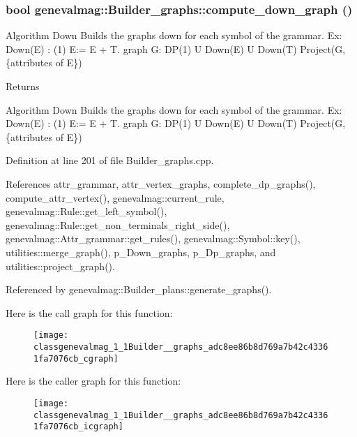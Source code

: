 \hypertarget{classgenevalmag_1_1Builder__graphs_adc8ee86b8d769a7b42c43361fa7076cb}{
\subsubsection[{compute\_\-down\_\-graph}]{\setlength{\rightskip}{0pt plus 5cm}bool genevalmag::Builder\_\-graphs::compute\_\-down\_\-graph ()}}
\label{classgenevalmag_1_1Builder__graphs_adc8ee86b8d769a7b42c43361fa7076cb}
Algorithm Down Builds the graphs down for each symbol of the grammar. Ex: Down(E) : (1) E:= E + T. graph G: DP(1) U Down(E) U Down(T) Project(G,\{attributes of E\}) \begin{DoxyReturn}{Returns}

\end{DoxyReturn}
Algorithm Down Builds the graphs down for each symbol of the grammar. Ex: Down(E) : (1) E:= E + T. graph G: DP(1) U Down(E) U Down(T) Project(G,\{attributes of E\}) 

Definition at line 201 of file Builder\_\-graphs.cpp.



References attr\_\-grammar, attr\_\-vertex\_\-graphs, complete\_\-dp\_\-graphs(), compute\_\-attr\_\-vertex(), genevalmag::current\_\-rule, genevalmag::Rule::get\_\-left\_\-symbol(), genevalmag::Rule::get\_\-non\_\-terminals\_\-right\_\-side(), genevalmag::Attr\_\-grammar::get\_\-rules(), genevalmag::Symbol::key(), utilities::merge\_\-graph(), p\_\-Down\_\-graphs, p\_\-Dp\_\-graphs, and utilities::project\_\-graph().



Referenced by genevalmag::Builder\_\-plans::generate\_\-graphs().



Here is the call graph for this function:\nopagebreak
\begin{figure}[H]
\begin{center}
\leavevmode
\texttt{[image: classgenevalmag\_1\_1Builder\_\_graphs\_adc8ee86b8d769a7b42c43361fa7076cb\_cgraph]}
\end{center}
\end{figure}




Here is the caller graph for this function:\nopagebreak
\begin{figure}[H]
\begin{center}
\leavevmode
\texttt{[image: classgenevalmag\_1\_1Builder\_\_graphs\_adc8ee86b8d769a7b42c43361fa7076cb\_icgraph]}
\end{center}
\end{figure}


